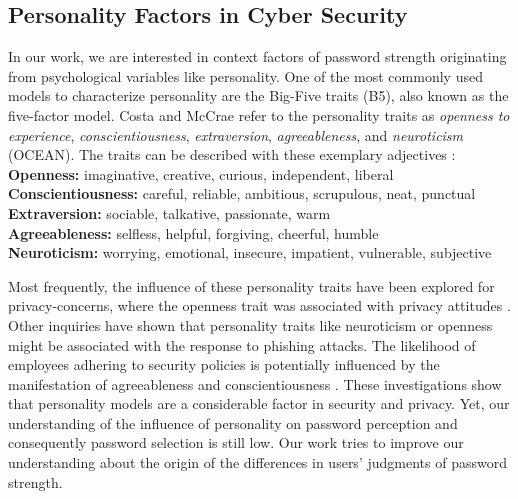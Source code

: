 \subsection{Personality Factors in Cyber Security}
In our work, we are interested in context factors of password strength originating from psychological variables like personality. One of the most commonly used models to characterize personality are the Big-Five traits (B5), also known as the five-factor model. Costa and McCrae \cite{Costa1992NEO} refer to the personality traits as \textit{openness to experience}, \textit{conscientiousness}, \textit{extraversion}, \textit{agreeableness}, and \textit{neuroticism} (OCEAN). The traits can be described with these exemplary adjectives \cite{McCrae1987ValidationFFM}:\\
\textbf{Openness:} imaginative, creative, curious, independent, liberal\\
\textbf{Conscientiousness:} careful, reliable, ambitious, scrupulous, neat, punctual\\
\textbf{Extraversion:} sociable, talkative, passionate, warm\\
\textbf{Agreeableness:} selfless, helpful, forgiving, cheerful, humble\\
\textbf{Neuroticism:} worrying, emotional, insecure, impatient, vulnerable, subjective

Most frequently, the influence of these personality traits have been explored for privacy-concerns, where the openness trait was associated with privacy attitudes \cite{Egelman2015PredictingAttitudes,Minkus2014PersonalizationPrivacy}. Other inquiries have shown that personality traits like neuroticism \cite{Halevi2013PilotStudyPersonality} or openness \cite{Uebelacker2014SocialEngineering} might be associated with the response to phishing attacks. The likelihood of employees adhering to security policies is potentially influenced by the manifestation of agreeableness and conscientiousness \cite{Shropshire2006PersonalityITSec,Shropshire2015}. These investigations show that personality  models are a considerable factor in security and privacy. Yet, our understanding of the influence of personality on password perception and consequently password selection is still low. Our work tries to improve our understanding about the origin of the differences in users' judgments of password strength. 

